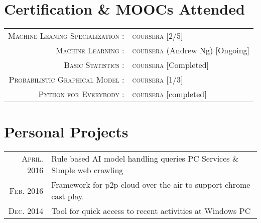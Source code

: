 \documentclass[a4paper,10pt]{article}
\begin{document}
\section{Certification \& MOOC\textquotesingle s Attended}
\begin{tabular}{rl}

\textsc{Machine Leaning Specialization :} & \textsc{coursera} [2/5]\\
\textsc{Machine Learning :} & \textsc{coursera} (\small Andrew Ng) [Ongoing]\\
\textsc{Basic Statistics :} & \textsc{coursera} [Completed]\\
\textsc{Probabilistic Graphical Model :} & \textsc{coursera} [1/3] \\
\textsc{Python for Everybody :} & \textsc{coursera} [completed] \\

\end{tabular}

\section{Personal Projects}
\begin{tabular}{rl}

\textsc{April.} 2016 & Rule based AI model handling queries PC Services \& Simple web crawling \\
\textsc{Feb.} 2016 & Framework for p2p cloud over the air to support chrome-cast play. \\
\textsc{Dec.} 2014 & Tool for quick access to recent activities at Windows PC\\


\end{tabular}
\end{document}
